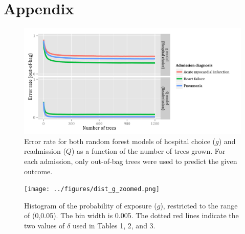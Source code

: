 \documentclass[]{article}\usepackage[]{graphicx}\usepackage[]{color}
\begin{document}
\printbibliography

\section{Appendix}
\begin{figure}[H]
    \includegraphics{../figures/error_rate_g_and_Q.png}
    \caption[Error rate for random forest model of hospital choice.]
      {Error rate for both random forest models of hospital choice ($g$) and readmission ($Q$) as a function of the number of trees grown. For each admission, only out-of-bag trees were used to predict the given outcome.}
    \label{fig:error_rate_for_g_and_Q}
\end{figure}


\begin{figure}[H]
    \texttt{[image: ../figures/dist\_g\_zoomed.png]}
    \caption[Histogram of the probability of exposure ($g$), restricted to the range of (0,0.05). The bin width is 0.005. The dotted red lines indicate the two values of $\delta$ used in Tables 1, 2, and 3.]
      {Histogram of the probability of exposure ($g$), restricted to the range of (0,0.05). The bin width is 0.005. The dotted red lines indicate the two values of $\delta$ used in Tables 1, 2, and 3.}
    \label{fig:dist_g_zoomed}
\end{figure}
\end{document}
